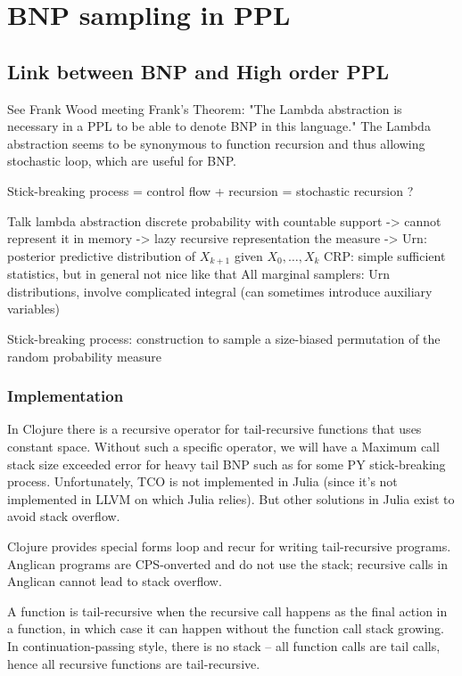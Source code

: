 
\chapter{BNP sampling in PPL}


\section{Link between BNP and High order PPL}
See Frank Wood meeting
Frank's Theorem: "The Lambda abstraction is necessary in a PPL to be able to denote BNP in this language." The Lambda abstraction seems to be synonymous to function recursion and thus allowing stochastic loop, which are useful for BNP.

Stick-breaking process = control flow + recursion = stochastic recursion ?

Talk lambda abstraction
discrete probability with countable support -> cannot represent it in memory
-> lazy recursive representation the measure
-> Urn: posterior predictive distribution of $X_{k+1}$ given $X_0, \dots, X_{k}$
CRP: simple sufficient statistics, but in general not nice like that
All marginal samplers: Urn distributions, involve complicated integral (can sometimes introduce auxiliary variables)

Stick-breaking process: construction to sample a size-biased permutation of the random probability measure

\subsection{Implementation}
In Clojure there is a recursive operator for tail-recursive functions that uses constant space. Without such a specific operator, we will have a Maximum call stack size exceeded error for heavy tail BNP such as for some PY stick-breaking process. Unfortunately, \gls{TCO} is not implemented in Julia (since it's not implemented in LLVM on which Julia relies). But other solutions in Julia exist to avoid stack overflow.

Clojure provides special forms loop and recur for writing tail-recursive programs. Anglican programs are \gls{CPS}-onverted and do not use the stack; recursive calls in Anglican cannot lead to stack overflow.

A function is tail-recursive when the recursive call happens as the final action in a function, in which case it can happen without the function call stack growing. In continuation-passing style, there is no stack – all function calls are tail calls, hence all recursive functions are tail-recursive.

